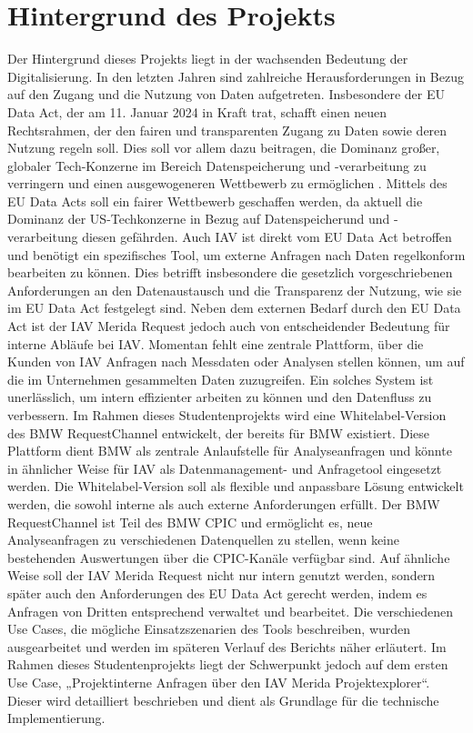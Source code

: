 \section{Hintergrund des Projekts}
Der Hintergrund dieses Projekts liegt in der wachsenden Bedeutung der Digitalisierung. In den letzten Jahren sind zahlreiche Herausforderungen in Bezug auf den Zugang und die Nutzung von Daten aufgetreten. Insbesondere der EU Data Act, der am 11. Januar 2024 in Kraft trat, schafft einen neuen Rechtsrahmen, der den fairen und transparenten Zugang zu Daten sowie deren Nutzung regeln soll. Dies soll vor allem dazu beitragen, die Dominanz großer, globaler Tech-Konzerne im Bereich Datenspeicherung und -verarbeitung zu verringern und einen ausgewogeneren Wettbewerb zu ermöglichen .\cite{EUData_JohnerInstitut,bmdv2024}
\newline
Mittels des EU Data Acts soll ein fairer Wettbewerb geschaffen werden, da aktuell die Dominanz der US-Techkonzerne in Bezug auf Datenspeicherund und -verarbeitung diesen gefährden. \cite{EUData_JohnerInstitut}
\newline
Auch IAV ist direkt vom EU Data Act betroffen und benötigt ein spezifisches Tool, um externe Anfragen nach Daten regelkonform bearbeiten zu können. Dies betrifft insbesondere die gesetzlich vorgeschriebenen Anforderungen an den Datenaustausch und die Transparenz der Nutzung, wie sie im EU Data Act festgelegt sind.
\newline
Neben dem externen Bedarf durch den EU Data Act ist der IAV Merida Request jedoch auch von entscheidender Bedeutung für interne Abläufe bei IAV. Momentan fehlt eine zentrale Plattform, über die Kunden von IAV Anfragen nach Messdaten oder Analysen stellen können, um auf die im Unternehmen gesammelten Daten zuzugreifen. Ein solches System ist unerlässlich, um intern effizienter arbeiten zu können und den Datenfluss zu verbessern. 
\newline
\newline
Im Rahmen dieses Studentenprojekts wird eine Whitelabel-Version des BMW RequestChannel entwickelt, der bereits für BMW existiert. Diese Plattform dient BMW als zentrale Anlaufstelle für Analyseanfragen und könnte in ähnlicher Weise für IAV als Datenmanagement- und Anfragetool eingesetzt werden. Die Whitelabel-Version soll als flexible und anpassbare Lösung entwickelt werden, die sowohl interne als auch externe Anforderungen erfüllt.
\newline
Der BMW RequestChannel ist Teil des BMW \ac{CPIC} und ermöglicht es, neue Analyseanfragen zu verschiedenen Datenquellen zu stellen, wenn keine bestehenden Auswertungen über die \ac{CPIC}-Kanäle verfügbar sind. Auf ähnliche Weise soll der IAV Merida Request nicht nur intern genutzt werden, sondern später auch den Anforderungen des EU Data Act gerecht werden, indem es Anfragen von Dritten entsprechend verwaltet und bearbeitet. 
\newline
Die verschiedenen Use Cases, die mögliche Einsatzszenarien des Tools beschreiben, wurden ausgearbeitet und werden im späteren Verlauf des Berichts näher erläutert. Im Rahmen dieses Studentenprojekts liegt der Schwerpunkt jedoch auf dem ersten Use Case, „Projektinterne Anfragen über den IAV Merida Projektexplorer“. Dieser wird detailliert beschrieben und dient als Grundlage für die technische Implementierung.

